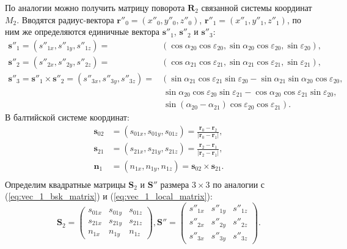 \documentclass[../main.tex]{subfiles}
\begin{document}
По аналогии можно получить матрицу поворота $\mathbf{R}_2$ связанной системы координат $M_2$. Вводятся радиус-вектора $\mathbf{r}''_0 = \left(x''_0, y''_0, z''_0\right)$,
$\mathbf{r}''_1 = \left(x''_1, y''_1, z''_1\right)$, по ним же определяются единичные вектора
$\mathbf{s}''_1$, $\mathbf{s}''_2$ и $\mathbf{s}''_3$:
\begin{equation}\label{eq:vec_2_local}
    \begin{split}
    \mathbf{s}''_1 = \left(s''_{1x}, s''_{1y}, s''_{1z}\right) =  &\left(\cos\alpha_{20} \cos\varepsilon_{20}, \sin\alpha_{20}\cos\varepsilon_{20}, \sin\varepsilon_{20}\right),\\
    \mathbf{s}''_2 = \left(s''_{2x}, s''_{2y}, s''_{2z}\right) = &\left(\cos\alpha_{21} \cos\varepsilon_{21}, \sin\alpha_{21}\cos\varepsilon_{21}, \sin\varepsilon_{21}\right),\\
    \mathbf{s}''_3 = \mathbf{s}''_1 \times \mathbf{s}''_2 = \left(s''_{3x}, s''_{3y}, s''_{3z}\right) =  &\left(\sin\alpha_{21}\cos\varepsilon_{21}\sin\varepsilon_{20} - \sin\alpha_{21}\sin\alpha_{20}\cos\varepsilon_{20},\right.\\
    &\ \sin\alpha_{20}\cos\varepsilon_{20}\sin\varepsilon_{21} - \cos\alpha_{20}\cos\varepsilon_{21}\sin\varepsilon_{20},\\
    &\ \left.\sin\left(\alpha_{20} - \alpha_{21}\right)\cos\varepsilon_{20}\cos\varepsilon_{21}\right).
    \end{split}
\end{equation}
В балтийской системе координат:
\begin{equation}\label{eq:vec_2_bsk}
    \begin{split}
        \mathbf{s}_{02} &= \left(s_{01x}, s_{01y}, s_{01z}\right) = \frac{\mathbf{r}_0 - \mathbf{r}_2}{|\mathbf{r}_0 - \mathbf{r}_1|},\\
        \mathbf{s}_{21} &= \left(s_{21x}, s_{21y}, s_{21z}\right) = \frac{\mathbf{r}_2 - \mathbf{r}_1}{|\mathbf{r}_2 - \mathbf{r}_1|},\\
        \mathbf{n}_1 &= \left(n_{1x}, n_{1y}, n_{1z}\right) = \mathbf{s}_{02} \times \mathbf{s}_{21}.\\
    \end{split}
\end{equation}
Определим квадратные матрицы $\mathbf{S}_2$ и $\mathbf{S}''$ размера $3 \times 3$ по аналогии с (\ref{eq:vec_1_bsk_matrix}) и (\ref{eq:vec_1_local_matrix}):
\begin{equation}\label{eq:vec_1_bsk_matrix}
    \mathbf{S}_2 =
    \left(
        \begin{matrix}
            s_{01x} & s_{01y} & s_{01z} \\
            s_{21x} & s_{21y} & s_{21z} \\
            n_{1x} & n_{1y} & n_{1z}
        \end{matrix}
    \right),
    \mathbf{S}'' =
    \left(
        \begin{matrix}
            s''_{1x} & s''_{1y} & s''_{1z} \\
            s''_{2x} & s''_{2y} & s''_{2z} \\
            s''_{3x} & s''_{3y} & s''_{3z}
        \end{matrix}
    \right).
\end{equation}
\end{document}
